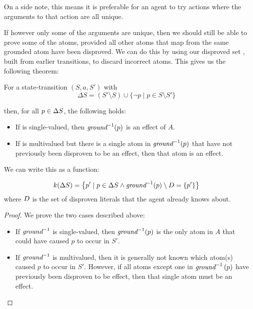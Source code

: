 \documentclass[../Master.tex]{subfiles}
\begin{document}
On a side note, this means it is preferable for an agent to try actions where the arguments to that action are all unique. 

If however only some of the arguments are unique, then we should still be able to prove some of the atoms, provided all other atoms that map from the same grounded atom have been disproved. We can do this by using our disproved set \Dsp, built from earlier transitions, to discard incorrect atoms. This gives us the following theorem: 

\begin{theorem} For a state-transition $(S,a,S')$ with 
	\begin{equation*}
	\Delta S = \left(S' \setminus S\right) \cup \{\neg p \mid  p \in S \setminus S' \}
	\end{equation*}
	
	then, for all $p \in \Delta S$, the following holds:
	
    \begin{itemize}
        \item If \invground is single-valued, then $\textit{ground} ^{-1}(p)$ is an effect of $A$.
        \item If \invground is multivalued but there is a single atom in $\textit{ground} ^{-1}(p)$ that have not previously been disproven to be an effect, then that atom is an effect.
    \end{itemize}

	We can write this as a function:
	
	\begin{equation*}
	k(\Delta S) = 
	\left\{
		p' \mid 
				p \in \Delta S \land 
				\textit{ground} ^{-1}(p) \setminus D = \{p'\}
		\right\}
	\end{equation*}
	where $D$ is the set of disproven literals that the agent already knows about.
\end{theorem}
	
\begin{proof}
    We prove the two cases described above:
    \begin{itemize}
        \item If $\textit{ground} ^{-1}$ is single-valued, then $\textit{ground} ^{-1} (p)$ is the only atom in $A$ that could have caused $p$ to occur in $S'$.
        \item If $\textit{ground} ^{-1}$ is multivalued, then it is generally not known which atom(s) caused $p$ to occur in $S'$. However, if all atoms except one in $\textit{ground} ^{-1}\left( p \right)$ have previously been disproven to be effect, then that single atom must be an effect. 
    \end{itemize}
\end{proof}
\end{document}
